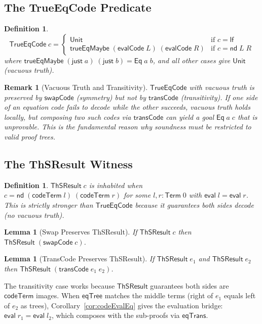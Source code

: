 \documentclass[11pt]{article}
\newtheorem{lemma}[theorem]{Lemma}
\newtheorem{definition}[theorem]{Definition}
\newtheorem{remark}[theorem]{Remark}
\newcommand{\lf}{\mathsf{lf}}
\newcommand{\nd}{\mathsf{nd}}
\newcommand{\eval}{\mathsf{eval}}
\newcommand{\codeTerm}{\mathsf{codeTerm}}
\newcommand{\eqTree}{\mathsf{eqTree}}
\newcommand{\transCode}{\mathsf{transCode}}
\newcommand{\swapCode}{\mathsf{swapCode}}
\newcommand{\Term}{\mathsf{Term}}
\newcommand{\Eq}{\mathsf{Eq}}
\newcommand{\ThSResult}{\mathsf{ThSResult}}
\newcommand{\TrueEqCode}{\mathsf{TrueEqCode}}
\newcommand{\evalCode}{\mathsf{evalCode}}
\begin{document}
\subsection{The TrueEqCode Predicate}

\begin{definition}
\[
  \TrueEqCode\;c =
  \begin{cases}
    \mathsf{Unit} & \text{if } c = \lf \\
    \mathsf{trueEqMaybe}\;(\evalCode\;L)\;(\evalCode\;R) & \text{if } c = \nd\;L\;R
  \end{cases}
\]
where $\mathsf{trueEqMaybe}\;(\mathsf{just}\;a)\;(\mathsf{just}\;b) = \Eq\;a\;b$,
and all other cases give $\mathsf{Unit}$ (vacuous truth).
\end{definition}

\begin{remark}[Vacuous Truth and Transitivity]\label{rmk:vacuous}
$\TrueEqCode$ with vacuous truth is preserved by $\swapCode$ (symmetry)
but \emph{not} by $\transCode$ (transitivity). If one side of an equation
code fails to decode while the other succeeds, vacuous truth holds locally,
but composing two such codes via $\transCode$ can yield a goal
$\Eq\;a\;c$ that is unprovable. This is the fundamental reason why
soundness must be restricted to valid proof trees.
\end{remark}

\subsection{The ThSResult Witness}

\begin{definition}
$\ThSResult\;c$ is inhabited when $c = \nd\;(\codeTerm\;l)\;(\codeTerm\;r)$
for some $l, r : \Term\;0$ with $\eval\;l = \eval\;r$. This is strictly
stronger than $\TrueEqCode$ because it guarantees both sides decode
(no vacuous truth).
\end{definition}

\begin{lemma}[Swap Preserves ThSResult]
If $\ThSResult\;c$ then $\ThSResult\;(\swapCode\;c)$.
\end{lemma}

\begin{lemma}[TransCode Preserves ThSResult]\label{lem:trans-thsr}
If $\ThSResult\;e_1$ and $\ThSResult\;e_2$ then $\ThSResult\;(\transCode\;e_1\;e_2)$.
\end{lemma}

\noindent The transitivity case works because $\ThSResult$ guarantees
both sides are $\codeTerm$ images. When $\eqTree$ matches the middle
terms (right of $e_1$ equals left of $e_2$ as trees), Corollary~\ref{cor:codeEvalEq}
gives the evaluation bridge: $\eval\;r_1 = \eval\;l_2$, which composes
with the sub-proofs via $\mathsf{eqTrans}$.
\end{document}
